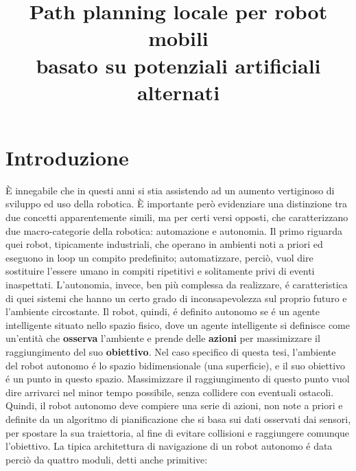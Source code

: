 \documentclass[14pt,a4paper]{extarticle}
\title{Path planning locale per robot mobili \\ basato su potenziali artificiali alternati}
\author{}
\date{}
\begin{document}
\maketitle \newpage %
\tableofcontents \newpage %

\section{Introduzione}
È innegabile che in questi anni si stia assistendo ad un aumento vertiginoso di sviluppo ed uso della robotica. È importante però evidenziare una distinzione tra due concetti apparentemente simili, ma per certi versi opposti, che caratterizzano due macro-categorie della robotica: automazione e autonomia. Il primo riguarda quei robot, tipicamente industriali, che operano in ambienti noti a priori ed eseguono in loop un compito predefinito; automatizzare, perciò, vuol dire sostituire l'essere umano in compiti ripetitivi e solitamente privi di eventi inaspettati. L'autonomia, invece, ben più complessa da realizzare, é caratteristica di quei sistemi che hanno un certo grado di inconsapevolezza sul proprio futuro e l'ambiente circostante.  Il robot, quindi, é definito autonomo se é un agente intelligente situato nello spazio fisico, dove un agente intelligente si definisce come un'entità che \textbf{osserva} l'ambiente e prende delle \textbf{azioni} per massimizzare il raggiungimento del suo \textbf{obiettivo}\cite{murphy}. Nel caso specifico di questa tesi, l'ambiente del robot autonomo é lo spazio bidimensionale (una superficie), e il suo obiettivo é un punto in questo spazio. Massimizzare il raggiungimento di questo punto vuol dire arrivarci nel minor tempo possibile, senza collidere con eventuali ostacoli. Quindi, il robot autonomo deve compiere una serie di azioni, non note a priori e definite da un algoritmo di pianificazione che si basa sui dati osservati dai sensori, per spostare la sua traiettoria, al fine di evitare collisioni e raggiungere comunque l'obiettivo. La tipica architettura di navigazione di un robot autonomo é data perciò da quattro moduli, detti anche primitive: 
\end{document}
